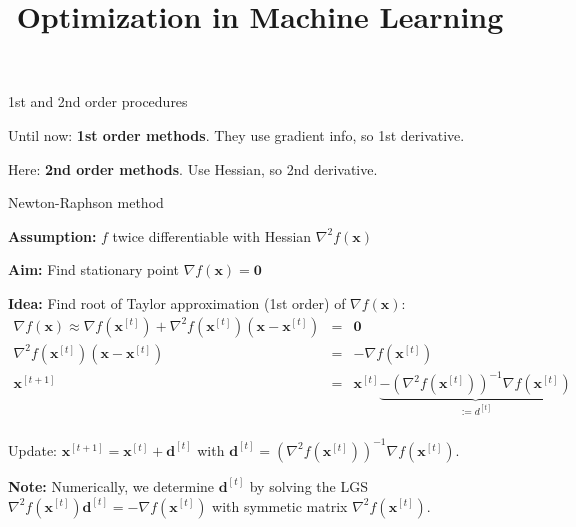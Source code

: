\documentclass[11pt,compress,t,notes=noshow, xcolor=table]{beamer}
\title{Optimization in Machine Learning}
\date{}
\begin{document}
\sloppy

\begin{vbframe}{1st and 2nd order procedures}

Until now: \textbf{1st order methods}. 
They use gradient info, so 1st derivative. 

\lz

Here: \textbf{2nd order methods}. Use Hessian, so 2nd derivative. 

\end{vbframe}

\begin{vbframe}{Newton-Raphson method}

\textbf{Assumption:} $f$ twice differentiable with Hessian $\nabla^2 f(\bm{x})$

\lz

\textbf{Aim:} Find stationary point $\nabla f(\bm{x}) = \bm{0}$
\lz 

\textbf{Idea:} Find root of Taylor approximation (1st order) of $\nabla f(\bm{x})$:
\begin{eqnarray*}
\nabla f(\mathbf{x}) \approx \nabla f(\mathbf{x}^{[t]}) +
\nabla^2 f(\mathbf{x}^{[t]})(\mathbf{x} - \mathbf{x}^{[t]}) &=& \mathbf{0} \\
\nabla^2 f(\mathbf{x}^{[t]})(\mathbf{x} - \mathbf{x}^{[t]}) &=& - \nabla f(\mathbf{x}^{[t]}) \\
\mathbf{x}^{[t+1]} &=& \mathbf{x}^{[t]} \underbrace{- \left(\nabla^2 f(\mathbf{x}^{[t]})\right)^{-1}\nabla f(\mathbf{x}^{[t]})}_{:= d^{[t]}} \\
\end{eqnarray*}

\vspace*{-0.2cm}

Update: $\bm{x}^{[t+1]} = \bm{x}^{[t]} + \bm{d}^{[t]}$ with $\bm{d}^{[t]} =  \left(\nabla^2 f(\mathbf{ x}^{[t]})\right)^{-1}\nabla f(\mathbf{x}^{[t]})$.

\vspace*{0.3cm}

\textbf{Note: } Numerically, we determine $\bm{d}^{[t]}$ by solving the LGS $\nabla^2 f(\mathbf{x}^{[t]})\bm{d}^{[t]} = - \nabla f(\mathbf{x}^{[t]})$ with symmetic matrix $\nabla^2 f(\mathbf{x}^{[t]})$. 



\end{vbframe}
\end{document}
